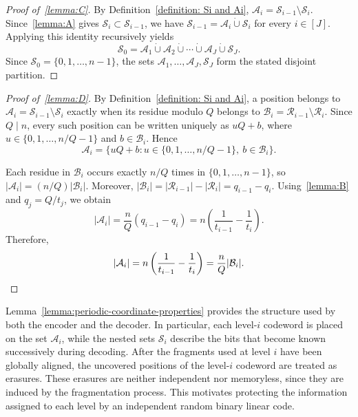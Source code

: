 \documentclass[journal,letterpaper,onecolumn,11pt]{IEEEtran}
\newcommand{\cA}{\mathcal{A}}
\newcommand{\cB}{\mathcal{B}}
\newcommand{\cR}{\mathcal{R}}
\newcommand{\cS}{\mathcal{S}}
\begin{document}
\begin{proof}[Proof of~\ref{lemma:C}]
By Definition~\ref{definition: Si and Ai},
\(\cA_i=\cS_{i-1}\setminus\cS_i\). Since~\ref{lemma:A} gives
\(\cS_i\subset\cS_{i-1}\), we have
\(\cS_{i-1}=\cA_i\mathbin{\dot\cup}\cS_i\) for every \(i\in[J]\).
Applying this identity recursively yields
\[
\cS_0
=\cA_1\mathbin{\dot\cup}\cA_2\mathbin{\dot\cup}\cdots
\mathbin{\dot\cup}\cA_J\mathbin{\dot\cup}\cS_J.
\]
Since \(\cS_0=\{0,1,\ldots,n-1\}\), the sets
\(\cA_1,\ldots,\cA_J,\cS_J\) form the stated disjoint partition. 
\end{proof}

\begin{proof}[Proof of~\ref{lemma:D}]
By Definition~\ref{definition: Si and Ai}, a position belongs to
\(\cA_i=\cS_{i-1}\setminus\cS_i\) exactly when its residue modulo \(Q\)
belongs to \(\cB_i=\cR_{i-1}\setminus\cR_i\). Since \(Q\mid n\), every
such position can be written uniquely as \(uQ+b\), where
\(u\in\{0,1,\ldots,n/Q-1\}\) and \(b\in\cB_i\). Hence
\[
\cA_i=\{uQ+b:u\in\{0,1,\ldots,n/Q-1\},\ b\in\cB_i\}.
\]

Each residue in \(\cB_i\) occurs exactly \(n/Q\) times in
\(\{0,1,\ldots,n-1\}\), so \(|\cA_i|=(n/Q)|\cB_i|\). Moreover,
\(|\cB_i|=|\cR_{i-1}|-|\cR_i|=q_{i-1}-q_i\). Using~\ref{lemma:B} and
\(q_j=Q/t_j\), we obtain
\[
|\cA_i|
=\frac{n}{Q}(q_{i-1}-q_i)
=n\left(\frac{1}{t_{i-1}}-\frac{1}{t_i}\right).
\]
Therefore,
\[
|\cA_i|
=n\left(\frac{1}{t_{i-1}}-\frac{1}{t_i}\right)
=\frac{n}{Q}|\cB_i|.\qedhere
\]
\end{proof}
Lemma~\ref{lemma:periodic-coordinate-properties} provides the
 structure used by both the encoder and the decoder. 
 In particular, each level-\(i\) codeword is placed on the set \(\cA_i\), while the nested sets \(\cS_i\) describe the bits that become known successively during decoding.
After the fragments used at level \(i\) have been globally
aligned, the uncovered positions of the level-\(i\) codeword are treated as erasures. 
These erasures are neither independent nor memoryless, since they
are induced by the fragmentation process. 
This motivates protecting the information assigned to each level by an independent random binary linear code.
\end{document}
